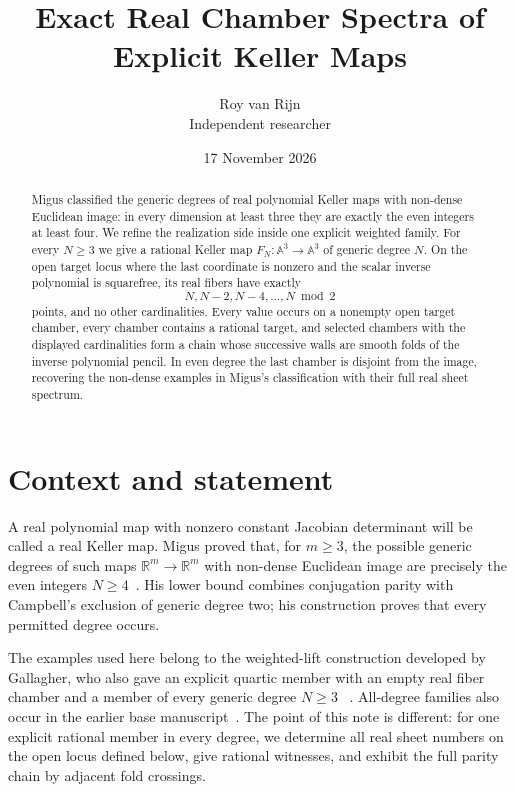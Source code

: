 \documentclass[11pt]{article}
\title{Exact Real Chamber Spectra of Explicit Keller Maps}
\author{Roy van Rijn\\{\small Independent researcher}}
\date{17 November 2026}
\newcommand{\A}{\mathbb A}
\newcommand{\R}{\mathbb R}
\numberwithin{equation}{section}
\begin{document}
\maketitle

\begin{abstract}
Migus classified the generic degrees of real polynomial Keller maps with
non-dense Euclidean image: in every dimension at least three they are exactly
the even integers at least four.  We refine the realization side inside one
explicit weighted family.  For every \(N\geq3\) we give a rational Keller map
\(F_N:\A^3\to\A^3\) of generic degree \(N\).  On the open target locus
where the last coordinate is nonzero and the scalar inverse polynomial is
squarefree, its real fibers have exactly
\[
  N,N-2,N-4,\ldots,N\bmod 2
\]
points, and no other cardinalities.  Every value occurs on a nonempty open
target chamber, every chamber contains a rational target, and selected
chambers with the displayed cardinalities form a chain whose successive
walls are smooth folds of the inverse polynomial pencil.  In even degree the
last chamber is disjoint from the image, recovering the non-dense examples
in Migus's classification with their full real sheet spectrum.
\end{abstract}

\section{Context and statement}

A real polynomial map with nonzero constant Jacobian determinant will be
called a real Keller map.  Migus proved that, for \(m\geq3\), the possible
generic degrees of such maps \(\R^m\to\R^m\) with non-dense Euclidean image
are precisely the even integers \(N\geq4\)~\cite{Migus}.  His lower bound
combines conjugation parity with Campbell's exclusion of generic degree two;
his construction proves that every permitted degree occurs.

The examples used here belong to the weighted-lift construction developed by
Gallagher, who also gave an explicit quartic member with an empty real
fiber chamber and a member of every generic degree \(N\geq3\)
~\cite{Gallagher}.  All-degree families also occur in the earlier base
manuscript~\cite{Base}.  The point of this note is different: for one
explicit rational member in every degree, we determine all real sheet
numbers on the open locus defined below, give rational witnesses, and
exhibit the full parity chain by adjacent fold crossings.
\end{document}
